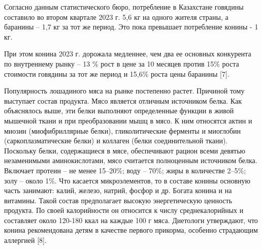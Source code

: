Согласно данным статистического бюро, потребление в Казахстане говядины
составило во втором квартале 2023 г. 5,6 кг на одного жителя страны, а
баранины -- 1,7 кг за тот же период. Это пока превышает потребление
конины - 1 кг.

При этом конина 2023 г. дорожала медленнее, чем два ее основных
конкурента по внутреннему рынку -- 13 \% рост в цене за 10 месяцев
против 15\% роста стоимости говядины за тот же период и 15,6\% роста
цены баранины {[}7{]}.

Популярность лошадиного мяса на рынке постепенно растет. Причиной тому
выступает состав продукта. Мясо является отличным источником белка. Как
объяснялось выше, эти белки выполняют определенные функции в живой
мышечной ткани и при преобразовании мышц в мясо. К ним относятся актин и
миозин (миофибриллярные белки), гликолитические ферменты и миоглобин
(саркоплазматические белки) и коллаген (белки соединительной ткани).
Поскольку белки, содержащиеся в мясе, обеспечивают рацион всеми девятью
незаменимыми аминокислотами, мясо считается полноценным источником
белка. Включает протеин -- не менее 15--20\%; воду -- 70\%; жиры в
количестве 2--5\%; золу -- около 1\%. Что касается микроэлементов, то в
составе конины основную часть занимают: калий, железо, натрий, фосфор и
др. Богата конина и на витамины. Такой состав предполагает высокую
энергетическую ценность продукта. По своей калорийности он относится к
числу среднекалорийных и составляет около 120-180 ккал на каждые 100 г
мяса. Диетологи утверждают, что конина рекомендована детям в качестве
первого прикорма, особенно страдающим аллергией {[}8{]}.

